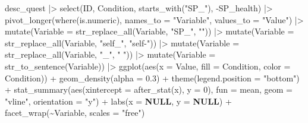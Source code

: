 \documentclass[
  bookmarksnumbered]{article}
\newenvironment{Shaded}{\begin{snugshade}}{\end{snugshade}}
\newcommand{\AttributeTok}[1]{\textcolor[rgb]{0.80,0.80,0.80}{#1}}
\newcommand{\ConstantTok}[1]{\textcolor[rgb]{0.86,0.64,0.64}{\textbf{#1}}}
\newcommand{\DecValTok}[1]{\textcolor[rgb]{0.86,0.86,0.80}{#1}}
\newcommand{\FloatTok}[1]{\textcolor[rgb]{0.75,0.75,0.82}{#1}}
\newcommand{\FunctionTok}[1]{\textcolor[rgb]{0.94,0.94,0.56}{#1}}
\newcommand{\NormalTok}[1]{\textcolor[rgb]{0.80,0.80,0.80}{#1}}
\newcommand{\SpecialCharTok}[1]{\textcolor[rgb]{0.86,0.64,0.64}{#1}}
\newcommand{\StringTok}[1]{\textcolor[rgb]{0.80,0.58,0.58}{#1}}
\begin{document}
\begin{Shaded}
\begin{Highlighting}[]
\NormalTok{desc\_quest }\SpecialCharTok{|\textgreater{}}
  \FunctionTok{select}\NormalTok{(ID, Condition, }\FunctionTok{starts\_with}\NormalTok{(}\StringTok{"SP\_"}\NormalTok{), }\SpecialCharTok{{-}}\NormalTok{SP\_health) }\SpecialCharTok{|\textgreater{}}
  \FunctionTok{pivot\_longer}\NormalTok{(}\FunctionTok{where}\NormalTok{(is.numeric),}
               \AttributeTok{names\_to =} \StringTok{"Variable"}\NormalTok{,}
               \AttributeTok{values\_to =} \StringTok{"Value"}\NormalTok{) }\SpecialCharTok{|\textgreater{}} 
  \FunctionTok{mutate}\NormalTok{(}\AttributeTok{Variable =} \FunctionTok{str\_replace\_all}\NormalTok{(Variable, }\StringTok{"SP\_"}\NormalTok{, }\StringTok{""}\NormalTok{)) }\SpecialCharTok{|\textgreater{}}
  \FunctionTok{mutate}\NormalTok{(}\AttributeTok{Variable =} \FunctionTok{str\_replace\_all}\NormalTok{(Variable, }\StringTok{"self\_"}\NormalTok{, }\StringTok{"self{-}"}\NormalTok{)) }\SpecialCharTok{|\textgreater{}}
  \FunctionTok{mutate}\NormalTok{(}\AttributeTok{Variable =} \FunctionTok{str\_replace\_all}\NormalTok{(Variable, }\StringTok{"\_"}\NormalTok{, }\StringTok{" "}\NormalTok{)) }\SpecialCharTok{|\textgreater{}}
  \FunctionTok{mutate}\NormalTok{(}\AttributeTok{Variable =} \FunctionTok{str\_to\_sentence}\NormalTok{(Variable)) }\SpecialCharTok{|\textgreater{}} 
  \FunctionTok{ggplot}\NormalTok{(}\FunctionTok{aes}\NormalTok{(}\AttributeTok{x =}\NormalTok{ Value, }\AttributeTok{fill =}\NormalTok{ Condition, }\AttributeTok{color =}\NormalTok{ Condition)) }\SpecialCharTok{+}
  \FunctionTok{geom\_density}\NormalTok{(}\AttributeTok{alpha =} \FloatTok{0.3}\NormalTok{) }\SpecialCharTok{+}
  \FunctionTok{theme}\NormalTok{(}\AttributeTok{legend.position =} \StringTok{"bottom"}\NormalTok{) }\SpecialCharTok{+}
  \FunctionTok{stat\_summary}\NormalTok{(}\FunctionTok{aes}\NormalTok{(}\AttributeTok{xintercept =} \FunctionTok{after\_stat}\NormalTok{(x), }\AttributeTok{y =} \DecValTok{0}\NormalTok{),}
               \AttributeTok{fun =}\NormalTok{ mean, }\AttributeTok{geom =} \StringTok{"vline"}\NormalTok{, }\AttributeTok{orientation =} \StringTok{"y"}\NormalTok{) }\SpecialCharTok{+}
  \FunctionTok{labs}\NormalTok{(}\AttributeTok{x =} \ConstantTok{NULL}\NormalTok{, }\AttributeTok{y =} \ConstantTok{NULL}\NormalTok{) }\SpecialCharTok{+}
  \FunctionTok{facet\_wrap}\NormalTok{(}\SpecialCharTok{\textasciitilde{}}\NormalTok{Variable, }\AttributeTok{scales =} \StringTok{"free"}\NormalTok{)}
\end{Highlighting}
\end{Shaded}
\end{document}
